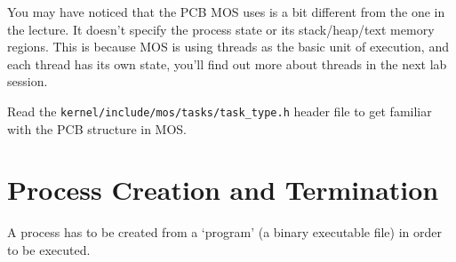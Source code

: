 You may have noticed that the PCB MOS uses is a bit different from the one in the lecture.
It doesn't specify the process state or its stack/heap/text memory regions. This is because
MOS is using threads as the basic unit of execution, and each thread has its own state,
you'll find out more about threads in the next lab session.

\begin{exercise}
    \item Read the \texttt{kernel/include/mos/tasks/task\_type.h} header file to get
    familiar with the PCB structure in MOS.
\end{exercise}

\section{Process Creation and Termination}

A process has to be created from a `program' (a binary executable file) in order to be
executed.
